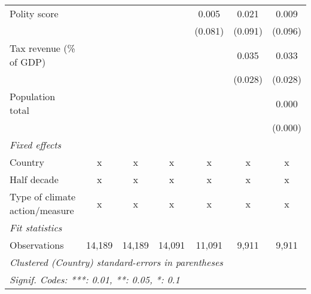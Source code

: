\begin{tabular}{lcccccc}
   Polity score                                              &               &               &              & 0.005         & 0.021         & 0.009\\   
                                                             &               &               &              & (0.081)       & (0.091)       & (0.096)\\   
   Tax revenue (\% of GDP)                                   &               &               &              &               & 0.035         & 0.033\\   
                                                             &               &               &              &               & (0.028)       & (0.028)\\   
   Population total                                          &               &               &              &               &               & 0.000\\   
                                                             &               &               &              &               &               & (0.000)\\   
   \emph{Fixed effects}\\
   Country                                                   & x             & x             & x            & x             & x             & x\\  
   Half decade                                               & x             & x             & x            & x             & x             & x\\  
   Type of climate action/measure                            & x             & x             & x            & x             & x             & x\\  
   \midrule \emph{Fit statistics}\\
   Observations                                              & 14,189        & 14,189        & 14,091       & 11,091        & 9,911         & 9,911\\  
   \midrule
   \multicolumn{7}{l}{\emph{Clustered (Country) standard-errors in parentheses}}\\
   \multicolumn{7}{l}{\emph{Signif. Codes: ***: 0.01, **: 0.05, *: 0.1}}\\
\end{tabular}
\par\endgroup


